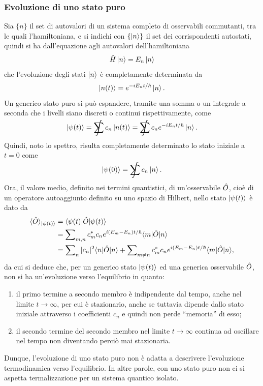 \subsubsection{Evoluzione di uno stato puro}
Sia $\{n\}$ il set di autovalori di un sistema completo di osservabili commutanti, tra le quali l'hamiltoniana, e si indichi con $\{\ket{n}\}$ il set dei corrispondenti autostati, quindi si ha dall'equazione agli autovalori dell'hamiltoniana
\begin{equation}
    \hat{H}\ket{n} = E_n\ket{n}
\end{equation}
che l'evoluzione degli stati $\ket{n}$ è completamente determinata da
\begin{equation}
    \ket{n(t)} = e^{-iE_nt/\hbar}\ket{n}.
\end{equation}
Un generico stato puro si può espandere, tramite una somma o un integrale a seconda che i livelli siano discreti o continui rispettivamente, come
\begin{equation}
    \ket{\psi(t)} = \sumint c_n\ket{n(t)} = \sumint c_ne^{-iE_nt/\hbar}\ket{n}.
\end{equation}
Quindi, noto lo spettro, risulta completamente determinato lo stato iniziale a $t = 0$ come
\begin{equation}
    \ket{\psi(0)} = \sumint c_n\ket{n}.
\end{equation}
Ora, il valore medio, definito nei termini quantistici, di un'osservabile $\hat{O}$, cioè di un operatore autoaggiunto definito su uno spazio di Hilbert, nello stato $\ket{\psi(t)}$ è dato da
\begin{equation}
    \begin{split}
        \langle \hat{O} \rangle_{\ket{\psi(t)}} &= \langle \psi(t) | \hat{O} | \psi(t) \rangle \\
        &= \sum\nolimits_{m,n} c_m^*c_ne^{i(E_m - E_n)t/\hbar}\langle m | \hat{O} | n \rangle \\
        &= \sum\nolimits_n|c_n|^2\langle n | \hat{O} | n \rangle + \sum\nolimits_{m\neq n}c_m^*c_ne^{i(E_m - E_n)t/\hbar}\langle m | \hat{O} | n \rangle,
    \end{split} 
\end{equation}
da cui si deduce che, per un generico stato $\ket{\psi(t)}$ ed una generica osservabile $\hat{O}$, non si ha un'evoluzione verso l'equilibrio in quanto:
\begin{enumerate}
    \item il primo termine a secondo membro è indipendente dal tempo, anche nel limite $t\to\infty$, per cui è stazionario, anche se tuttavia dipende dallo stato iniziale attraverso i coefficienti $c_n$ e quindi non perde ``memoria'' di esso;
    \item il secondo termine del secondo membro nel limite $t\to\infty$ continua ad oscillare nel tempo non diventando perciò mai stazionaria.
\end{enumerate}
Dunque, l'evoluzione di uno stato puro non è adatta a descrivere l'evoluzione termodinamica verso l'equilibrio. In altre parole, con uno stato puro non ci si aspetta termalizzazione per un sistema quantico isolato. 

